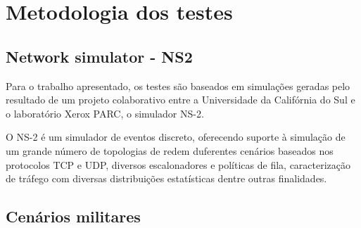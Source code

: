 \section{Metodologia dos testes} 

\subsection{Network simulator - NS2}
Para o trabalho apresentado, os testes s\~ao baseados em simula\c{c}\~oes geradas pelo resultado de um projeto colaborativo entre a Universidade da Calif\'ornia do Sul e o laborat\'orio Xerox PARC, o simulador NS-2.

O NS-2 \'e um simulador de eventos discreto, oferecendo suporte \`a simula\c{c}\~ao de um grande n\'umero de topologias de redem duferentes cen\'arios baseados nos protocolos TCP e UDP, diversos escalonadores e pol\'iticas de fila, caracteriza\c{c}\~ao de tr\'afego com diversas distribui\c{c}\~oes estat\'isticas dentre outras finalidades.


\subsection{Cen\'arios militares}


